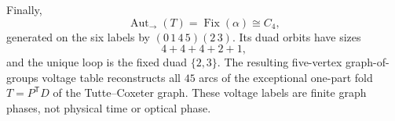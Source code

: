 Finally,
\[
 \operatorname{Aut}_{\rightarrow}(T)=\operatorname{Fix}(\alpha)\cong C_4,
\]
generated on the six labels by $(0\,1\,4\,5)(2\,3)$.  Its duad orbits have sizes
\[
 4+4+4+2+1,
\]
and the unique loop is the fixed duad $\{2,3\}$.  The resulting five-vertex graph-of-groups voltage table reconstructs all $45$ arcs of the exceptional one-part fold $T=P^{\mathsf T}D$ of the Tutte--Coxeter graph.  These voltage labels are finite graph phases, not physical time or optical phase.
